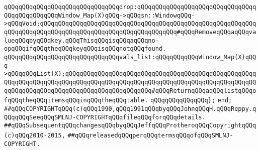 \verb|qQQqqQQqqQQqqQQqqQQqqQQqqQQqqQQqdrop:qQQqqQQqqQQqqQQqqQQqqQQqqQQqqQQqqQQqqQQqqQQqqQQqWindow_Map(X)qQQq->qQQqsn::WindowqQQq->qQQqVoid;qQQqqQQqqQQqqQQqqQQqqQQqqQQqqQQqqQQqqQQqqQQqqQQqqQQqqQQqqQQqqQQqqQQqqQQqqQQqqQQqqQQqqQQqqQQqqQQqqQQqqQQqqQQq#qQQqRemoveqQQqaqQQqvalueqQQqbyqQQqkey.qQQqThisqQQqisqQQqaqQQqno-opqQQqifqQQqtheqQQqkeyqQQqisqQQqnotqQQqfound.|\newline
\newline
\verb|qQQqqQQqqQQqqQQqqQQqqQQqqQQqqQQqvals_list:qQQqqQQqqQQqWindow_Map(X)qQQq->qQQqqQQqList(X);qQQqqQQqqQQqqQQqqQQqqQQqqQQqqQQqqQQqqQQqqQQqqQQqqQQqqQQqqQQqqQQqqQQqqQQqqQQqqQQqqQQqqQQqqQQqqQQqqQQqqQQqqQQqqQQqqQQqqQQqqQQqqQQqqQQqqQQqqQQqqQQqqQQqqQQqqQQqqQQqqQQq#qQQqReturnqQQqaqQQqlistqQQqofqQQqtheqQQqitemsqQQqinqQQqtheqQQqtable.|\newline
\verb|qQQqqQQqqQQqqQQq};|\newline
\verb|end;|\newline
\newline
\newline
\verb|##qQQqCOPYRIGHTqQQq(c)qQQq1990,qQQq1991qQQqbyqQQqJohnqQQqH.qQQqReppy.qQQqqQQqSeeqQQqSMLNJ-COPYRIGHTqQQqfileqQQqforqQQqdetails.|\newline
\verb|##qQQqSubsequentqQQqchangesqQQqbyqQQqJeffqQQqProtheroqQQqCopyrightqQQq(c)qQQq2010-2015,|\newline
\verb|##qQQqreleasedqQQqperqQQqtermsqQQqofqQQqSMLNJ-COPYRIGHT.|\newline

